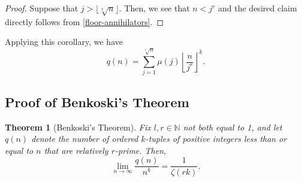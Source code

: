 \documentclass[10pt,a4paper]{article}
\newtheorem{theorem}{Theorem}[section]
\theoremstyle{definition}
\theoremstyle{remark}
\begin{document}
\begin{proof}
Suppose that $j>\lfloor \sqrt[r]{n}\rfloor$. Then, we see that $n < j^r$ and the desired claim directly follows from \cref{floor-annihilators}.
\end{proof}
	
Applying this corollary, we have
\begin{equation}\label{finite-mobius}
		q(n)=\sum_{j=1}^{\sqrt[r]{n}}\mu(j)\left\lfloor\frac{n}{j^r}\right\rfloor^k.
\end{equation}
	
\subsection{Proof of Benkoski's Theorem}
\begin{theorem}[Benkoski's Theorem]
	Fix \(l,r\in \mathbb{N}\) not both equal to 1, and let \(q(n)\) denote the number of ordered \(k\)-tuples of positive integers less than or equal to \(n\) that are relatively \(r\)-prime. Then, \begin{equation}
		\lim\limits_{n\to\infty} \frac{q(n)}{n^k} = \frac{1}{\zeta(rk)}.
	\end{equation} 
\end{theorem}
\end{document}
